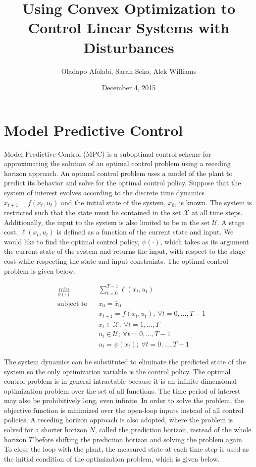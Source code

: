 \documentclass[12 pt]{report}
\title{Using Convex Optimization to Control Linear Systems with Disturbances}
\author{Oladapo Afolabi, Sarah Seko, Alek Williams}
\date{December 4, 2015}
\begin{document}
\maketitle

\begin{abstract}
\end{abstract}

\section{Model Predictive Control}

Model Predictive Control (MPC) is a suboptimal control scheme for approximating the solution of an optimal control problem using a receding horizon approach. An optimal control problem uses a model of the plant to predict its behavior and solve for the optimal control policy. Suppose that the system of interest evolves according to the discrete time dynamics $x_{t+1} = f(x_t, u_t)$ and the initial state of the system, $\bar{x}_0$, is known. The system is restricted such that the state must be contained in the set $\mathcal{X}$ at all time steps. Additionally, the input to the system is also limited to be in the set $\mathcal{U}$. A stage cost, $\ell (x_t, u_t)$ is defined as a function of the current state and input. We would like to find the optimal control policy, $\psi(\cdot)$, which takes as its argument the current state of the system and returns the input, with respect to the stage cost while respecting the state and input constraints. The optimal control problem is given below.

\begin{equation*}
\begin{aligned}
& \min_{\psi(\cdot)} & & \sum_{t = 0}^{T-1} \ell (x_t, u_t) \\
& \text{subject to} & & x_0 = \bar{x}_0 \\
& & & x_{t+1} = f(x_t, u_t); ~ \forall t = 0, \dots, T-1 \\
& & & x_t \in \mathcal{X}; ~ \forall t = 1, \dots, T \\
& & & u_t \in \mathcal{U}; ~ \forall t = 0, \dots, T-1 \\
& & & u_t = \psi (x_t); ~ \forall t = 0, \dots, T-1
\end{aligned}
\end{equation*}

The system dynamics can be substituted to eliminate the predicted state of the system so the only optimization variable is the control policy. The optimal control problem is in general intractable because it is an infinite dimensional optimization problem over the set of all functions. The time period of interest may also be prohibitively long, even infinite. In order to solve the problem, the objective function is minimized over the open-loop inputs instead of all control policies. A receding horizon approach is also adopted, where the problem is solved for a shorter horizon $N$, called the prediction horizon, instead of the whole horizon $T$ before shifting the prediction horizon and solving the problem again. To close the loop with the plant, the measured state at each time step is used as the initial condition of the optimization problem, which is given below.
\end{document}
